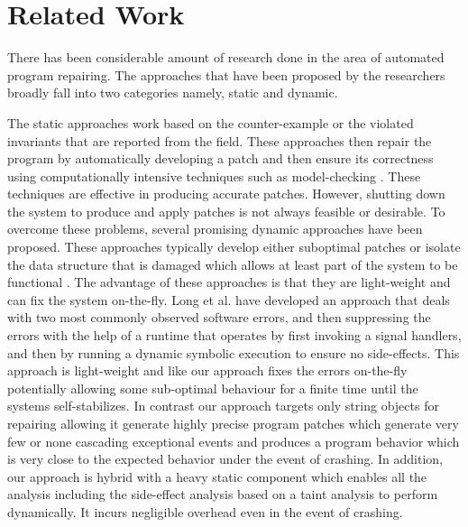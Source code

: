 \section{Related Work}
\label{sec:relatedWork}

There has been considerable amount of research done in the area of automated
program repairing. The approaches that have been proposed by the researchers
broadly fall into two categories namely, static and dynamic.

The static approaches work based on the counter-example or the violated
invariants that are reported from the field. These approaches then repair the
program by automatically developing a patch and then ensure its correctness
using computationally intensive techniques such as model-checking
\cite{biere2014, wei-issta-2010}.
These techniques are effective in producing accurate patches. However, shutting
down the system to produce and apply patches is not always feasible or
desirable. To overcome these problems, several promising dynamic approaches have
been proposed. These approaches typically develop either suboptimal patches or
isolate the data structure that is damaged which allows at least part of the
system to be functional \cite{conf/issre/DemskyR03, conf/icse/DemskyR05,
conf/issta/DemskyEGMPR06}. The advantage of these approaches is that they are
light-weight and can fix the system on-the-fly. Long et al.
\cite{conf/pldi/LongSR14} have developed an approach that deals with two most
commonly observed software errors, and then suppressing the errors with the help
of a runtime that operates by first invoking a  signal handlers, and then by
running a dynamic symbolic execution to ensure no side-effects.
This approach is light-weight and like our approach fixes the errors on-the-fly
potentially allowing some sub-optimal behaviour for a finite time until the
systems self-stabilizes.
In contrast our approach targets only string objects for repairing allowing it
generate highly precise program patches which generate very few or none
cascading exceptional events and produces a program behavior which is very close
to the expected behavior under the event of crashing.
In addition, our approach is hybrid with a heavy static component which enables
all the analysis including the side-effect analysis based on a taint analysis to
perform dynamically. It incurs negligible overhead even in the event of
crashing.

